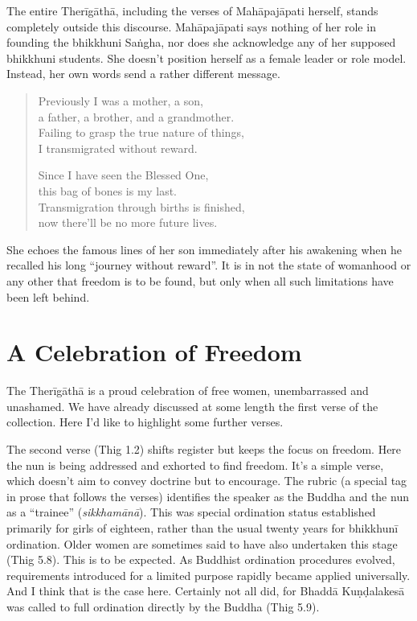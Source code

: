 \documentclass[12pt,openany]{book}%
\begin{document}
The entire \textsanskrit{Therīgāthā}, including the verses of \textsanskrit{Mahāpajāpati} herself, stands completely outside this discourse. \textsanskrit{Mahāpajāpati} says nothing of her role in founding the bhikkhuni \textsanskrit{Saṅgha}, nor does she acknowledge any of her supposed bhikkhuni students. She doesn’t position herself as a female leader or role model. Instead, her own words send a rather different message.

\begin{quotation}%
Previously I was a mother, a son,\\

a father, a brother, and a grandmother.\\

Failing to grasp the true nature of things,\\

I transmigrated without reward.

Since I have seen the Blessed One,\\

this bag of bones is my last.\\

Transmigration through births is finished,\\

now there’ll be no more future lives.

%
\end{quotation}

She echoes the famous lines of her son immediately after his awakening when he recalled his long “journey without reward”. It is in not the state of womanhood or any other that freedom is to be found, but only when all such limitations have been left behind.

\section*{A Celebration of Freedom}

The \textsanskrit{Therīgāthā} is a proud celebration of free women, unembarrassed and unashamed. We have already discussed at some length the first verse of the collection. Here I’d like to highlight some further verses.

The second verse (Thig 1.2) shifts register but keeps the focus on freedom. Here the nun is being addressed and exhorted to find freedom. It’s a simple verse, which doesn’t aim to convey doctrine but to encourage. The rubric (a special tag in prose that follows the verses) identifies the speaker as the Buddha and the nun as a “trainee” (\textit{\textsanskrit{sikkhamānā}}). This was special ordination status established primarily for girls of eighteen, rather than the usual twenty years for \textsanskrit{bhikkhunī} ordination. Older women are sometimes said to have also undertaken this stage (Thig 5.8). This is to be expected. As Buddhist ordination procedures evolved, requirements introduced for a limited purpose rapidly became applied universally. And I think that is the case here. Certainly not all did, for \textsanskrit{Bhaddā} \textsanskrit{Kuṇḍalakesā} was called to full ordination directly by the Buddha (Thig 5.9).
\end{document}
